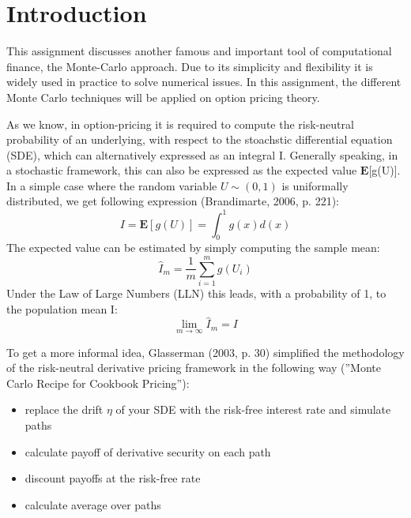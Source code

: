 \documentclass[a4paper,11pt]{article}
\begin{document}
\newpage                %

\listoffigures
\newpage


\tableofcontents

\newpage
{}      %
\setcounter{page}{1}        %
\section{Introduction}
This assignment discusses another famous and important tool of computational finance, the Monte-Carlo approach. Due to its simplicity and flexibility it is widely used in practice to solve numerical issues. In this assignment, the different Monte Carlo techniques will be applied on option pricing theory. 

As we know, in option-pricing it is required to compute the risk-neutral probability of an underlying, with respect to the stoachstic differential equation (SDE), which can alternatively expressed as an integral I. Generally speaking, in a stochastic framework, this can also be expressed as the expected value $\mathbf{E}$[g(U)]. In a simple case where the random variable $U \sim (0,1)$ is uniformally distributed, we get following expression (Brandimarte, 2006, p. 221):
\begin{equation*}
I=\mathbf{E}[g(U)] = \int_0^1 g(x)d(x)
\end{equation*}
The expected value can be estimated by simply computing the sample mean:
\begin{equation*}
\hat{I}_m = \dfrac{1}{m}\sum^m_{i=1}g(U_i)
\end{equation*}
Under the Law of Large Numbers (LLN) this leads, with a probability of 1, to the population mean I:
\begin{equation*}
\lim_{m\rightarrow\infty} \hat{I}_m = I
\end{equation*} 

To get a more informal idea, Glasserman (2003, p. 30) simplified the methodology of the risk-neutral derivative pricing framework in the following way (''Monte Carlo Recipe for Cookbook Pricing''):\\
\begin{itemize}
\item replace the drift $\eta$ of your SDE with the risk-free interest rate and simulate paths
\item calculate payoff of derivative security on each path
\item discount payoffs at the risk-free rate
\item calculate average over paths\\
\end{itemize}
\end{document}
